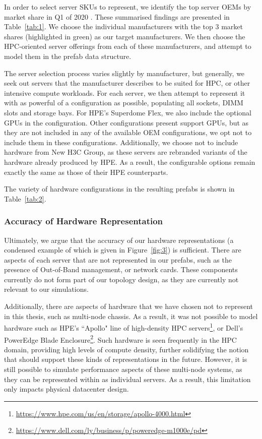 \documentclass[11pt]{article}
\begin{document}
			In order to select server SKUs to represent, we identify the top server OEMs by market share in Q1 of 2020 \cite{Macatee2020}. These summarised findings are presented in Table~\ref{tab:1}.
			We choose the individual manufacturers with the top 3 market shares (highlighted in green) as our target manufacturers.
			We then choose the HPC-oriented server offerings from each of these manufacturers, and attempt to model them in the prefab data structure.
			
			The server selection process varies slightly by manufacturer, but generally, we seek out servers that the manufacturer describes to be suited for HPC, or other intensive compute workloads.
			For each server, we then attempt to represent it with as powerful of a configuration as possible, populating all sockets, DIMM slots and storage bays.
			For HPE's Superdome Flex, we also include the optional GPUs in the configuration.
			Other configurations present support GPUs, but as they are not included in any of the available OEM configurations, we opt not to include them in these configurations.
			Additionally, we choose not to include hardware from New H3C Group, as these servers are rebranded variants of the hardware already produced by HPE.
			As a result, the configurable options remain exactly the same as those of their HPE counterparts.

			The variety of hardware configurations in the resulting prefabs is shown in Table~\ref{tab:2}.



		\subsubsection{Accuracy of Hardware Representation}
			Ultimately, we argue that the accuracy of our hardware representations (a condensed example of which is given in Figure~\ref{fig:3}) is sufficient.
			There are aspects of each server that are not represented in our prefabs, such as the presence of Out-of-Band management, or network cards.
			These components currently do not form part of our topology design, as they are currently not relevant to our simulations.

			Additionally, there are aspects of hardware that we have chosen not to represent in this thesis, such as multi-node chassis.
			As a result, it was not possible to model hardware such as HPE's ``Apollo" line of high-density HPC servers\footnote{\url{https://www.hpe.com/us/en/storage/apollo-4000.html}}, or Dell's PowerEdge Blade Enclosure\footnote{\url{https://www.dell.com/ly/business/p/poweredge-m1000e/pd}}.
			Such hardware is seen frequently in the HPC domain, providing high levels of compute density, further solidifying the notion that \opendc{} should support these kinds of representations in the future.
			However, it is still possible to simulate performance aspects of these multi-node systems, as they can be represented within \opendc{} as individual servers.
			As a result, this limitation only impacts physical datacenter design.
\end{document}
